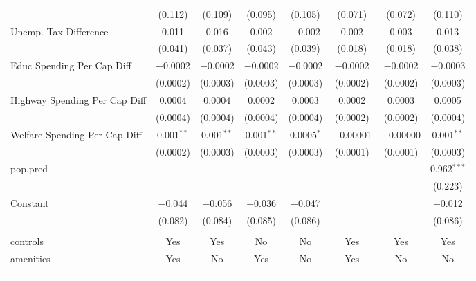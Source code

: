 \begin{table}[!htbp]
\begin{tabular}{@{\extracolsep{5pt}}lccccccc}
  & (0.112) & (0.109) & (0.095) & (0.105) & (0.071) & (0.072) & (0.110) \\ 
  Unemp. Tax Difference & 0.011 & 0.016 & 0.002 & $-$0.002 & 0.002 & 0.003 & 0.013 \\ 
  & (0.041) & (0.037) & (0.043) & (0.039) & (0.018) & (0.018) & (0.038) \\ 
  Educ Spending Per Cap Diff & $-$0.0002 & $-$0.0002 & $-$0.0002 & $-$0.0002 & $-$0.0002 & $-$0.0002 & $-$0.0003 \\ 
  & (0.0002) & (0.0003) & (0.0003) & (0.0003) & (0.0002) & (0.0002) & (0.0003) \\ 
  Highway Spending Per Cap Diff & 0.0004 & 0.0004 & 0.0002 & 0.0003 & 0.0002 & 0.0003 & 0.0005 \\ 
  & (0.0004) & (0.0004) & (0.0004) & (0.0004) & (0.0002) & (0.0002) & (0.0004) \\ 
  Welfare Spending Per Cap Diff & 0.001$^{**}$ & 0.001$^{**}$ & 0.001$^{**}$ & 0.0005$^{*}$ & $-$0.00001 & $-$0.00000 & 0.001$^{**}$ \\ 
  & (0.0002) & (0.0003) & (0.0003) & (0.0003) & (0.0001) & (0.0001) & (0.0003) \\ 
  pop.pred &  &  &  &  &  &  & 0.962$^{***}$ \\ 
  &  &  &  &  &  &  & (0.223) \\ 
  Constant & $-$0.044 & $-$0.056 & $-$0.036 & $-$0.047 &  &  & $-$0.012 \\ 
  & (0.082) & (0.084) & (0.085) & (0.086) &  &  & (0.086) \\ 
 \hline \\[-1.8ex] 
controls & Yes & Yes & No & No & Yes & Yes & Yes \\ 
amenities & Yes & No & Yes & No & Yes & No & No \\ 
\hline \\[-1.8ex] 
\hline 
\hline \\[-1.8ex] 
\end{tabular} 
\end{table} 
